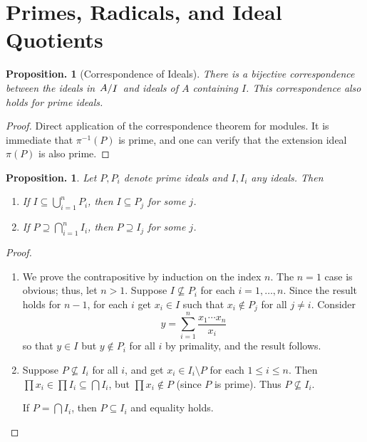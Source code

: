 \documentclass[11pt, a4paper]{memoir}
\theoremstyle{change}
\newtheorem{proposition}[theorem]{Proposition.}
\theoremstyle{plain}
\theoremstyle{nonumberplain}
\newtheorem{proof}{Proof}
\newcommand{\quot}[2]{\mathchoice{\left.\raisebox{0.10em}{$#1$}\middle/\raisebox{-0.10em}{$#2$}\right.}
                                 {\left.\raisebox{0.04em}{$#1$}\middle/\raisebox{-0.04em}{$#2$}\right.}
                                 {\left.\raisebox{0.01em}{$#1$}\middle/\raisebox{-0.01em}{$#2$}\right.}
                                 {\left.\raisebox{0em}{$#1$}\middle/\raisebox{0em}{$#2$}\right.}}
\numberwithin{equation}{section}
\begin{document}
\section{Primes, Radicals, and Ideal Quotients}
\begin{proposition}[Correspondence of Ideals]
    There is a bijective correspondence between the ideals in $\quot{A}{I}$ and ideals of $A$ containing $I$.
    This correspondence also holds for prime ideals.
\end{proposition}
\begin{proof}
    Direct application of the correspondence theorem for modules.
    It is immediate that $\pi^{-1}(P)$ is prime, and one can verify that the extension ideal $\pi(P)$ is also prime.
\end{proof}
\begin{proposition}
    Let $P,P_i$ denote prime ideals and $I,I_i$ any ideals.
    Then
    \begin{enumerate}[nl,r]
        \item If $I\subseteq\bigcup_{i=1}^n P_i$, then $I\subseteq P_j$ for some $j$.
        \item If $P\supseteq \bigcap_{i=1}^n I_i$, then $P\supseteq I_j$ for some $j$.
    \end{enumerate}
\end{proposition}
\begin{proof}
    \begin{enumerate}[nl,r]
        \item We prove the contrapositive by induction on the index $n$.
            The $n=1$ case is obvious; thus, let $n>1$.
            Suppose $I\not\subseteq P_i$ for each $i=1,\ldots,n$.
            Since the result holds for $n-1$, for each $i$ get $x_i\in I$ such that $x_i\notin P_j$ for all $j\neq i$.
            Consider
            \begin{equation*}
                y=\sum_{i=1}^n\frac{x_1\cdots x_n}{x_i}
            \end{equation*}
            so that $y\in I$ but $y\notin P_i$ for all $i$ by primality, and the result follows.
        \item Suppose $P\not\subseteq I_i$ for all $i$, and get $x_i\in I_i\setminus P$ for each $1\leq i\leq n$.
            Then $\prod x_i\in\prod I_i\subseteq\bigcap I_i$, but $\prod x_i\notin P$ (since $P$ is prime).
            Thus $P\not\subseteq I_i$.

            If $P=\bigcap I_i$, then $P\subseteq I_i$ and equality holds.
    \end{enumerate}
\end{proof}
\end{document}

